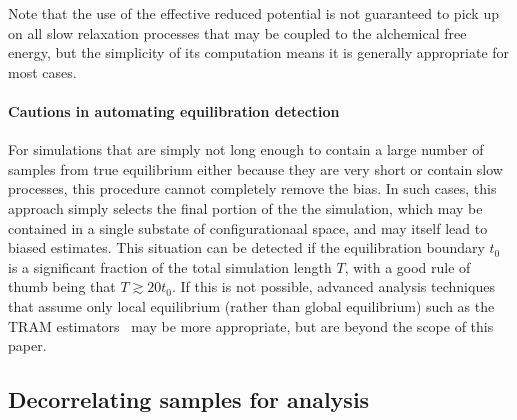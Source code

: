 \documentclass[9pt,bestpractices]{livecoms}
\begin{document}
Note that the use of the effective reduced potential is not guaranteed to pick up on all slow relaxation processes that may be coupled to the alchemical free energy, but the simplicity of its computation means it is generally appropriate for most cases.

\paragraph{Cautions in automating equilibration detection}
For simulations that are simply not long enough to contain a large number of samples from true equilibrium either because they are very short or contain slow processes, this procedure cannot completely remove the bias.
In such cases, this approach simply selects the final portion of the the simulation, which may be contained in a single substate of configurationaal space, and may itself lead to biased estimates. 
This situation can be detected if the equilibration boundary $t_0$ is a significant fraction of the total simulation length $T$, with a good rule of thumb being that $T \gtrsim 20 t_0$.
If this is not possible, advanced analysis techniques that assume only local equilibrium (rather than global equilibrium) such as the TRAM estimators~\cite{mey2014xtram,wu2016multiensemble,nuske2017markov} may be more appropriate, but are beyond the scope of this paper. 

\subsection{Decorrelating samples for analysis}
\label{sec:decorrelating-samples}
\end{document}
